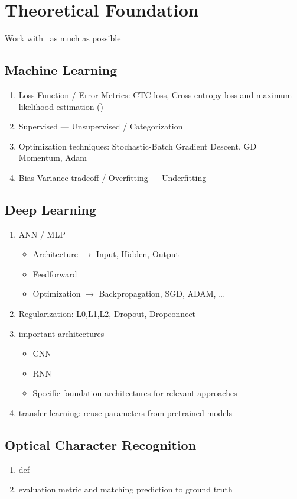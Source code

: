 \chapter{Theoretical Foundation}\label{ch:theoretical}

Work with~\cite{goodfellow_deep_2016} as much as possible

\section{Machine Learning}

\begin{enumerate}
    \item Loss Function / Error Metrics: CTC-loss, Cross entropy loss and maximum likelihood
        estimation (\cite{goodfellow_deep_2016})
    \item Supervised --- Unsupervised / Categorization
    \item Optimization techniques: Stochastic-Batch Gradient Descent, GD Momentum, Adam
    \item Bias-Variance tradeoff / Overfitting --- Underfitting
\end{enumerate}

\section{Deep Learning}

\begin{enumerate}
    \item ANN / MLP %
        \begin{itemize}
            \item Architecture $\rightarrow$ Input, Hidden, Output
            \item Feedforward
            \item Optimization $\rightarrow$ Backpropagation, SGD, ADAM, \ldots
        \end{itemize}
    \item Regularization: L0,L1,L2, Dropout, Dropconnect
    \item important architectures
        \begin{itemize}
            \item CNN %
            \item RNN %
            \item Specific foundation architectures for relevant approaches
        \end{itemize}
    \item transfer learning: reuse parameters from pretrained models\\
\end{enumerate}

\section{Optical Character Recognition}

\begin{enumerate}
    \item def
    \item evaluation metric and matching prediction to ground truth
\end{enumerate}
